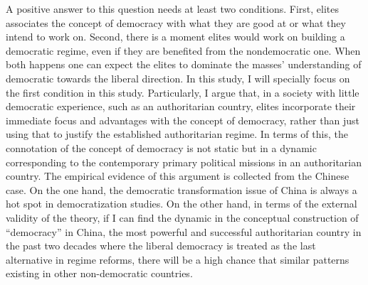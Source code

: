 \documentclass[abstracton,UTF8]{ctexart}
\begin{document}
A positive answer to this question needs at least two conditions. First, elites associates the concept of democracy with what they are good at or what they intend to work on. Second, there is a moment elites would work on building a democratic regime, even if they are benefited from the nondemocratic one. When both happens one can expect the elites to dominate the masses' understanding of democratic towards the liberal direction. In this study, I will specially focus on the first condition in this study. Particularly, I argue that, in a society with little democratic experience, such as an authoritarian country, elites incorporate their immediate focus and advantages with the concept of democracy, rather than just using that to justify the established authoritarian regime. In terms of this, the connotation of the concept of democracy is not static but in a dynamic corresponding to the contemporary primary political missions in an authoritarian country. The empirical evidence of this argument is collected from the Chinese case. On the one hand, the democratic transformation issue of China is always a hot spot in democratization studies\citep[for instance, see ][]{Dickson2000,Dickson1997,Pei1995,Chen2002a,White1994,Howell1998,Tien1999,Zheng1999,Zheng2004}. On the other hand, in terms of the external validity of the theory, if I can find the dynamic in the conceptual construction of ``democracy'' in China, the most powerful and successful authoritarian country in the past two decades where the liberal democracy is treated as the last alternative in regime reforms, there will be a high chance that similar patterns existing in other non-democratic countries.
\end{document}

